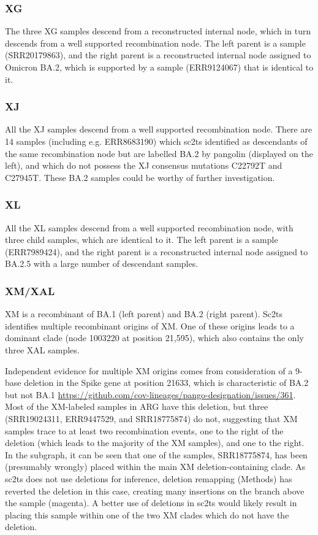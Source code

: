 \documentclass[12pt]{article}
\begin{document}
\subsubsection{XG}
\label{sec:dd_xg}
The three XG samples descend from a reconstructed internal node,
which in turn descends from a well supported recombination node.
The left parent is a sample (SRR20179863), and
the right parent is a reconstructed internal node
assigned to Omicron BA.2,
which is supported by a sample (ERR9124067) that is identical to it.

\subsubsection{XJ}
\label{sec:dd_xj}
All the XJ samples descend from a well supported recombination node.
There are 14 samples (including e.g. ERR8683190)
which sc2ts identified as descendants of the same recombination node
but are labelled BA.2 by pangolin (displayed on the left), and
which do not possess the XJ consensus mutations C22792T and C27945T.
These BA.2 samples could be worthy of further investigation.

\subsubsection{XL}
\label{sec:dd_xl}
All the XL samples descend from a well supported recombination node,
with three child samples, which are identical to it.
The left parent is a sample (ERR7989424), and
the right parent is a reconstructed internal node
assigned to BA.2.5 with a large number of descendant samples.

\subsubsection{XM/XAL}
\label{sec:dd_xm}

XM is a recombinant of BA.1 (left parent) and BA.2 (right parent).
Sc2ts identifies multiple recombinant origins of XM.
One of these origins leads to a dominant clade
(node 1003220 at position 21,595),
which also contains the only three XAL samples.

Independent evidence for multiple XM origins
comes from consideration of a 9-base deletion
in the Spike gene at position 21633,
which is characteristic of BA.2 but not BA.1
\url{https://github.com/cov-lineages/pango-designation/issues/361}.
Most of the XM-labeled samples in ARG have this deletion,
but three (SRR19024311, ERR9447529, and SRR18775874) do not,
suggesting that XM samples trace to at least two recombination events,
one to the right of the deletion
(which leads to the majority of the XM samples), and one to the right.
In the subgraph, it can be seen that one of the samples, SRR18775874,
has been (presumably wrongly) placed
within the main XM deletion-containing clade.
As sc2ts does not use deletions for inference,
deletion remapping (Methods) has reverted the deletion in this case,
creating many insertions on the branch above the sample (magenta).
A better use of deletions in sc2ts would likely result
in placing this sample within one of the two XM clades
which do not have the deletion.
\end{document}
